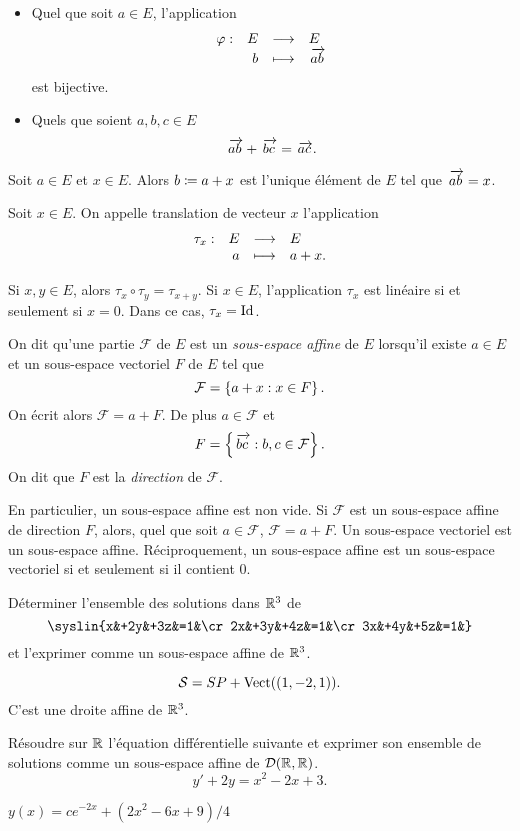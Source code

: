 \documentclass{magnolia}
\begin{document}
\begin{proposition}
\begin{itemize}
\item Quel que soit $a\in E$, l'application
  \[\begin{array}[t]{lrcl} \displaystyle{\varphi} : & \displaystyle{E} & \longrightarrow & \displaystyle{E} \\ & \displaystyle{b} & \longmapsto & \displaystyle{\kern 2pt\overrightarrow{\kern -2ptab}} \end{array}\]
  est bijective.
\item Quels que soient $a, b, c\in E$
  \[\kern 2pt\overrightarrow{\kern -2ptab}+\kern 2pt\overrightarrow{\kern -2ptbc}=\kern 2pt\overrightarrow{\kern -2ptac}.\]
\end{itemize}
\end{proposition}

\begin{remarqueUnique}
\remarque Soit $a\in E$ et $x\in E$. Alors $b\coloneqq a+x$ est l'unique élément de $E$ tel
  que $\kern 2pt\overrightarrow{\kern -2ptab}=x$.
\end{remarqueUnique}

\begin{definition}
Soit $x\in E$. On appelle translation de vecteur $x$ l'application
\[\begin{array}[t]{lrcl} \displaystyle{\tau_x} : & \displaystyle{E} & \longrightarrow & \displaystyle{E} \\ & \displaystyle{a} & \longmapsto & \displaystyle{a+x.} \end{array}\]
\end{definition}

\begin{remarques}
\remarque Si $x,y\in E$, alors $\tau_x \circ \tau_y=\tau_{x+y}$. 
\remarque Si $x\in E$, l'application $\tau_x$ est linéaire si et seulement si $x=0$.
  Dans ce cas, $\tau_x=\operatorname{Id}$.
\end{remarques}



\begin{definition}
On dit qu'une partie $\mathcal{F}$ de $E$ est un \emph{sous-espace affine} de $E$
lorsqu'il existe $a\in E$ et un sous-espace vectoriel $F$ de $E$ tel que
\[\mathcal{F}=\left\{a+x : x\in F\right\}.\]
On écrit alors $\mathcal{F}=a+F$. De plus $a\in\mathcal{F}$ et
\[F=\left\{\kern 2pt\overrightarrow{\kern -2ptbc} : b, c\in\mathcal{F}\right\}.\]
On dit que $F$ est la \emph{direction} de $\mathcal{F}$.
\end{definition}

\begin{remarques}
\remarque En particulier, un sous-espace affine est non vide.
\remarque Si $\mathcal{F}$ est un sous-espace affine de direction $F$, alors, quel que
  soit $a\in\mathcal{F}$, $\mathcal{F}=a+F$.
\remarque Un sous-espace vectoriel est un sous-espace affine. Réciproquement, un sous-espace
  affine est un sous-espace vectoriel si et seulement si il contient 0.
\end{remarques}

\begin{exos}
\exo Déterminer l'ensemble des solutions dans $\mathbb{R}^3$ de
  \[\syslin{x&+2y&+3z&=1&\cr
           2x&+3y&+4z&=1&\cr
           3x&+4y&+5z&=1&}\]
  et l'exprimer comme un sous-espace affine de $\mathbb{R}^3$.
\begin{sol}
$$\mathcal{S}=SP+\operatorname{Vect}((1,-2,1)).$$ C'est une droite affine de $\mathbb{R}^3$.
\end{sol}
\exo Résoudre sur $\mathbb{R}$ l'équation différentielle suivante et exprimer son ensemble de
  solutions comme un sous-espace affine de $\mathcal{D}(\mathbb{R},\mathbb{R})$.
  \[y'+2y=x^2-2x+3.\]

\begin{sol}
$y(x)=ce^{-2x}+(2x^2-6x+9)/4$
\end{sol}
\end{exos}
\end{document}
